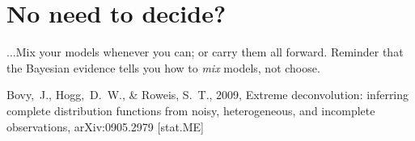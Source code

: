 \documentclass[12pt,twoside]{article}
\begin{document}
\section{No need to decide?}

...Mix your models whenever you can; or carry them all forward.  Reminder
that the Bayesian evidence tells you how to \emph{mix} models, not
choose.

\clearpage
{}\theendnotes

\clearpage
\begin{thebibliography}{}
  Bovy,~J., Hogg,~D.~W., \& Roweis, S.~T., 2009,
  Extreme deconvolution: inferring complete distribution functions from noisy, heterogeneous, and incomplete observations, 
  arXiv:0905.2979 [stat.ME]
\end{thebibliography}
\end{document}

